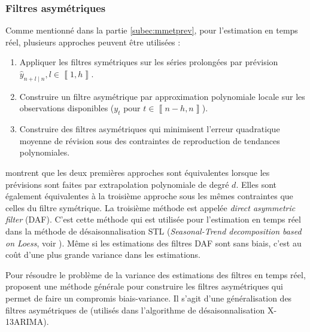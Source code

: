 \documentclass[
  12pt,
  a4paper,french]{article}
\newcommand\1{\mathds{1}}
\begin{document}
\hypertarget{subsec-lppasymf}{%
\subsubsection{Filtres asymétriques}\label{subsec-lppasymf}}

Comme mentionné dans la partie \ref{subec:mmetprev}, pour l'estimation en temps réel, plusieurs approches peuvent être utilisées :

\begin{enumerate}
\def\labelenumi{\arabic{enumi}.}
\item
  Appliquer les filtres symétriques sur les séries prolongées par prévision \(\hat{y}_{n+l\mid n},l\in\left\llbracket 1,h\right\rrbracket\).
\item
  Construire un filtre asymétrique par approximation polynomiale locale sur les observations disponibles (\(y_{t}\) pour \(t\in\left\llbracket n-h,n\right\rrbracket\)).
\item
  Construire des filtres asymétriques qui minimisent l'erreur quadratique moyenne de révision sous des contraintes de reproduction de tendances polynomiales.
\end{enumerate}

\textcite{proietti2008} montrent que les deux premières approches sont équivalentes lorsque les prévisions sont faites par extrapolation polynomiale de degré \(d\).
Elles sont également équivalentes à la troisième approche sous les mêmes contraintes que celles du filtre symétrique.
La troisième méthode est appelée \emph{direct asymmetric filter} (DAF).
C'est cette méthode qui est utilisée pour l'estimation en temps réel dans la méthode de désaisonnalisation STL (\emph{Seasonal-Trend decomposition based on Loess}, voir \textcite{cleveland90}).
Même si les estimations des filtres DAF sont sans biais, c'est au coût d'une plus grande variance dans les estimations.

Pour résoudre le problème de la variance des estimations des filtres en temps réel, \textcite{proietti2008} proposent une méthode générale pour construire les filtres asymétriques qui permet de faire un compromis biais-variance.
Il s'agit d'une généralisation des filtres asymétriques de \textcite{musgrave1964set} (utilisés dans l'algorithme de désaisonnalisation X-13ARIMA).
\end{document}
